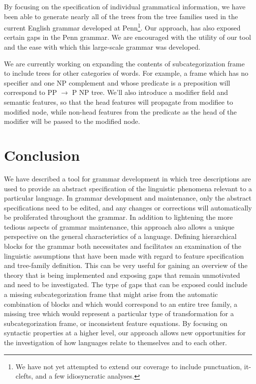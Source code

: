 By focusing on the specification of individual grammatical information, we
have been able to generate nearly all of the trees from the tree families 
used in the current English grammar developed at Penn\footnote{We have not yet
attempted to extend our coverage to include punctuation, it-clefts, and a few
idiosyncratic analyses.}. 
 Our approach, has also exposed certain gaps in the Penn grammar.
We are encouraged with the utility of our tool and the ease with which this
large-scale grammar was developed.


We are currently working on expanding the contents of
subcategorization frame to include 
trees for other categories of words. For example, 
a frame which has no specifier and one NP complement
and whose predicate is a preposition will correspond to
PP $\rightarrow$ P NP tree. We'll also introduce a modifier field
and semantic features, so that the head features will propagate
from modifiee to modified node, while non-head features from
the predicate as the head of the modifier will be passed to
the modified node.







\section{Conclusion}

We have described a tool for grammar development in which tree descriptions are
used to provide an abstract specification of the linguistic phenomena relevant
to a particular language.  In grammar development and maintenance, only the
abstract specifications need to be edited, and any changes or corrections will
automatically be proliferated throughout the grammar.  In addition to
lightening the more tedious aspects of grammar maintenance, this approach also
allows a unique perspective on the general characteristics of a language.
Defining hierarchical blocks for the grammar both necessitates and facilitates
an examination of the linguistic assumptions that have been made with regard to
feature specification and tree-family definition. This can be very useful for
gaining an overview of the theory that is being implemented and exposing gaps
that remain unmotivated and need to be investigated.  The type of gaps that can
be exposed could include a missing subcategorization frame that might arise
from the automatic combination of blocks and which would correspond to an
entire tree family, a missing tree which would represent a particular type of
transformation for a subcategorization frame, or inconsistent feature
equations.  By focusing on syntactic properties at a higher level, our
approach allows new opportunities for the investigation of how languages relate
to themselves and to each other.
 


%

%
